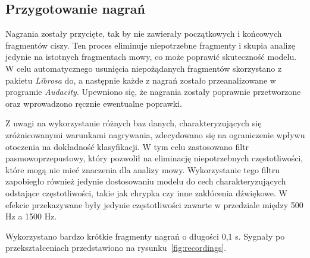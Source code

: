 \subsection{Przygotowanie nagrań}
\label{subsec:preprocessing}

Nagrania zostały przycięte, tak by nie zawierały początkowych i końcowych fragmentów ciszy.
Ten proces eliminuje niepotrzebne fragmenty i skupia analizę jedynie na istotnych fragmentach mowy, co może poprawić skuteczność modelu.
W celu automatycznego usunięcia niepożądanych fragmentów skorzystano z pakietu \emph{Librosa} do, a następnie każde z nagrań zostało przeanalizowane w programie \emph{Audacity}.
Upewniono się, że nagrania zostały poprawnie przetworzone oraz wprowadzono ręcznie ewentualne poprawki.

Z uwagi na wykorzystanie różnych baz danych, charakteryzujących się zróżnicowanymi warunkami nagrywania, zdecydowano się na ograniczenie wpływu otoczenia na dokładność klasyfikacji.
W tym celu zastosowano filtr pasmowoprzepustowy, który pozwolił na eliminację niepotrzebnych częstotliwości, które mogą nie mieć znaczenia dla analizy mowy.
Wykorzystanie tego filtru zapobiegło również jedynie dostosowaniu modelu do cech charakteryzujących odstające częstotliwości, takie jak chrypka czy inne zakłócenia dźwiękowe.
W efekcie przekazywane były jedynie częstotliwości zawarte w przedziale między 500 Hz a 1500 Hz.

Wykorzystano bardzo krótkie fragmenty nagrań o długości 0,1 s.
Sygnały po przekształceniach przedstawiono na rysunku~\ref{fig:recordings}.

